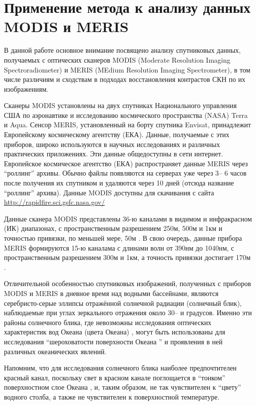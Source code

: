 \newpage

\section{Применение метода к анализу данных MODIS и MERIS} \label{sec:1.4}



В данной работе основное внимание посвящено анализу спутниковых данных, получаемых с оптических сканеров MODIS (Moderate Resolution Imaging Spectroradiometer) и MERIS (MEdium Resolution Imaging Spectrometer), в том числе различиям и сходствам в подходах восстановления контрастов СКН по их изображениям. 

Сканеры MODIS установлены на двух спутниках Национального управления США по аэронавтике и исследованию космического пространства (NASA) Terra и Aqua. Сенсор MERIS, установленный на борту спутника Envisat, принадлежит Европейскому космическому агентству (ЕКА). Данные, получаемые с этих приборов, широко используются в научных исследованиях и различных практических приложениях. Эти данные общедоступны в сети интернет. Европейское космическое агентство (ЕКА) распространяет данные MERIS через ``роллинг'' архивы. Обычно файлы появляются на серверах уже через 3-- 6 часов после получения их спутником и удаляются через 10 дней (отсюда название ``роллинг'' архива). Данные MODIS доступны для скачивания с сайта \url{http://rapidfire.sci.gsfc.nasa.gov/}

Данные сканера MODIS представлены 36-ю каналами в видимом и инфракрасном (ИК) диапазонах, с пространственным разрешением 250м, 500м и 1км и точностью привязки, по меньшей мере, 50м \citep{Salomonson1989, Wolfe2002}. В свою очередь, данные прибора MERIS формируются 15-ю каналама с длинами волн от 390нм до 1040нм, с пространственным разрешением 300м и 1км, а точность привязки достигает 170м \citep{Goryl2004}.

Отличительной особенностью спутниковых изображений, полученных с приборов MODIS и MERIS в дневное время над водными бассейнами, являются серебристо-серые эллипсы отражённой солнечной радиации (солнечный блик), наблюдаемые при углах зеркального отражения около 30-- и градусов. Именно эти районы солнечного блика, где невозможны исследования оптических характеристик вод Океана (цвета Океана) \citep{Esaias1998}, могут быть использованы для исследования ``шероховатости поверхности Океана '' и проявления в ней различных океанических явлений. 

Напомним, что для исследования солнечного блика наиболее предпочтителен красный канал, поскольку свет в красном канале поглощается в ``тонком'' поверхностном слое Океана \citep{Jerlov1976}, и, таким образом, не так чувствителен к ``цвету'' водного столба, а также не чувствителен к поверхностной температуре.

